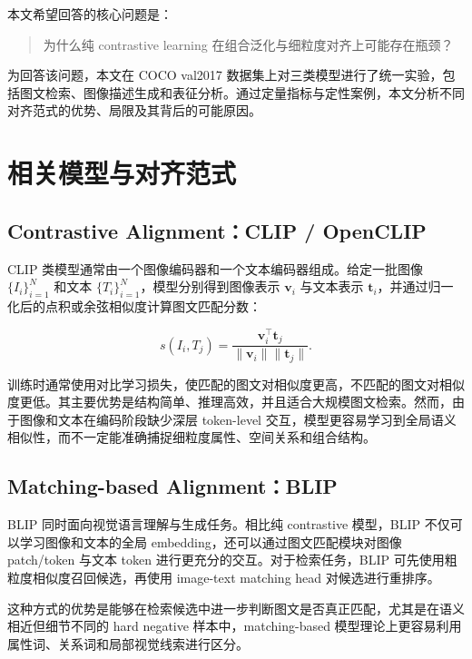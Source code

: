 \documentclass[UTF8,a4paper,10pt]{ctexart}
\begin{document}
本文希望回答的核心问题是：

\begin{quote}
为什么纯 contrastive learning 在组合泛化与细粒度对齐上可能存在瓶颈？
\end{quote}

为回答该问题，本文在 COCO val2017 数据集上对三类模型进行了统一实验，包括图文检索、图像描述生成和表征分析。通过定量指标与定性案例，本文分析不同对齐范式的优势、局限及其背后的可能原因。

\section{相关模型与对齐范式}

\subsection{Contrastive Alignment：CLIP / OpenCLIP}

CLIP 类模型通常由一个图像编码器和一个文本编码器组成。给定一批图像 $\{I_i\}_{i=1}^{N}$ 和文本 $\{T_i\}_{i=1}^{N}$，模型分别得到图像表示 $\mathbf{v}_i$ 与文本表示 $\mathbf{t}_i$，并通过归一化后的点积或余弦相似度计算图文匹配分数：

\begin{equation}
s(I_i, T_j) = \frac{\mathbf{v}_i^\top \mathbf{t}_j}{\|\mathbf{v}_i\| \|\mathbf{t}_j\|}.
\end{equation}

训练时通常使用对比学习损失，使匹配的图文对相似度更高，不匹配的图文对相似度更低。其主要优势是结构简单、推理高效，并且适合大规模图文检索。然而，由于图像和文本在编码阶段缺少深层 token-level 交互，模型更容易学习到全局语义相似性，而不一定能准确捕捉细粒度属性、空间关系和组合结构。

\subsection{Matching-based Alignment：BLIP}

BLIP 同时面向视觉语言理解与生成任务。相比纯 contrastive 模型，BLIP 不仅可以学习图像和文本的全局 embedding，还可以通过图文匹配模块对图像 patch/token 与文本 token 进行更充分的交互。对于检索任务，BLIP 可先使用粗粒度相似度召回候选，再使用 image-text matching head 对候选进行重排序。

这种方式的优势是能够在检索候选中进一步判断图文是否真正匹配，尤其是在语义相近但细节不同的 hard negative 样本中，matching-based 模型理论上更容易利用属性词、关系词和局部视觉线索进行区分。
\end{document}
